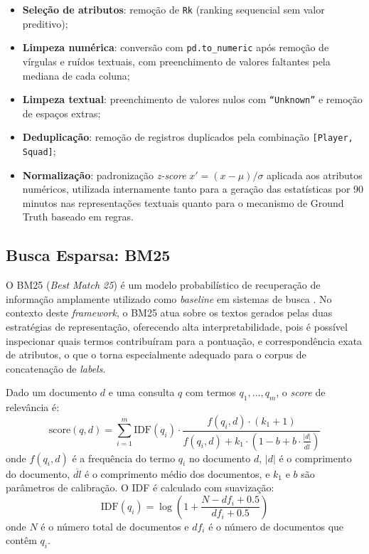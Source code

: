 \documentclass[portuguese]{sbc2025}
\begin{document}
\begin{itemize}
  \item \textbf{Seleção de atributos}: remoção de \texttt{Rk} (ranking sequencial
        sem valor preditivo);

  \item \textbf{Limpeza numérica}: conversão com \texttt{pd.to\_numeric} após remoção
        de vírgulas e ruídos textuais, com preenchimento de valores faltantes pela
        mediana de cada coluna;

  \item \textbf{Limpeza textual}: preenchimento de valores nulos com
        \texttt{``Unknown''} e remoção de espaços extras;

  \item \textbf{Deduplicação}: remoção de registros duplicados pela combinação
        \texttt{[Player, Squad]};

  \item \textbf{Normalização}: padronização \textit{z-score}
        $x' = (x - \mu) / \sigma$
        aplicada aos atributos numéricos, utilizada internamente tanto para a
        geração das estatísticas por 90 minutos nas representações textuais quanto
        para o mecanismo de Ground Truth baseado em regras.
\end{itemize}

\subsection{Busca Esparsa: BM25}

O BM25 (\textit{Best Match 25}) é um modelo probabilístico de recuperação de
informação amplamente utilizado como \textit{baseline} em sistemas de busca
\citep{robertson2009}. No contexto deste \textit{framework}, o BM25 atua sobre os
textos gerados pelas duas estratégias de representação, oferecendo alta
interpretabilidade, pois é possível inspecionar quais termos contribuíram para a
pontuação, e correspondência exata de atributos, o que o torna especialmente adequado
para o corpus de concatenação de \textit{labels}.

Dado um documento $d$ e uma consulta $q$ com termos $q_1, \ldots, q_m$, o
\textit{score} de relevância é:
\[
  \text{score}(q, d) = \sum_{i=1}^{m} \text{IDF}(q_i) \cdot
    \frac{f(q_i, d) \cdot (k_1 + 1)}
         {f(q_i, d) + k_1 \cdot \left(1 - b + b \cdot \frac{|d|}{\overline{dl}}\right)}
\]
onde $f(q_i, d)$ é a frequência do termo $q_i$ no documento $d$, $|d|$ é o comprimento
do documento, $\overline{dl}$ é o comprimento médio dos documentos, e $k_1$ e $b$ são
parâmetros de calibração. O IDF é calculado com suavização:
\[
  \text{IDF}(q_i) = \log\!\left(1 + \frac{N - df_i + 0.5}{df_i + 0.5}\right)
\]
onde $N$ é o número total de documentos e $df_i$ é o número de documentos que contêm
$q_i$.
\end{document}
